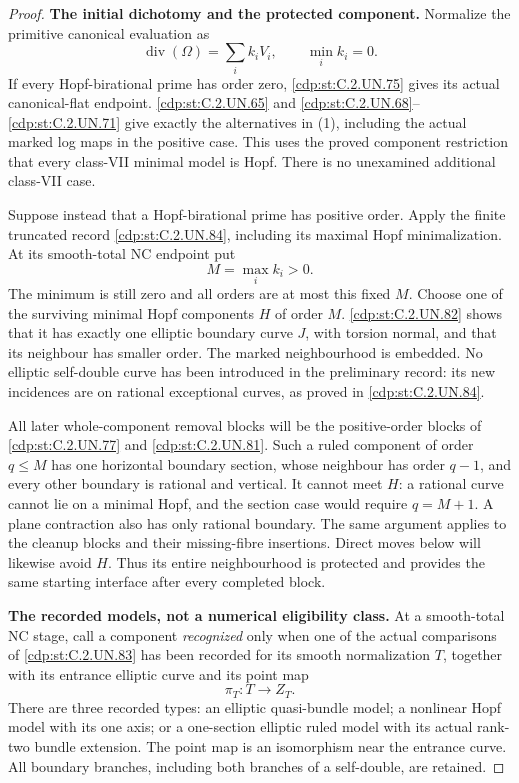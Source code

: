 \begin{proof}
\par\medskip\noindent\textbf{The initial dichotomy and the protected component.}
Normalize the primitive canonical evaluation as
\[
       \operatorname{div}(\Omega)=\sum_i k_iV_i,
       \qquad \min_i k_i=0.
 \tag{C.GP.2}\label{cdp:eq:C.GP.2}
\]
If every Hopf-birational prime has order zero, \ref{cdp:st:C.2.UN.75}
gives its actual canonical-flat endpoint. \ref{cdp:st:C.2.UN.65} and
\ref{cdp:st:C.2.UN.68}--\ref{cdp:st:C.2.UN.71} give exactly the alternatives in (1),
including the actual marked log maps in the positive
case. This uses the proved component restriction that
every class-VII minimal model is Hopf. There is no
unexamined additional class-VII case.

Suppose instead that a Hopf-birational prime has
positive order. Apply the finite truncated record
\ref{cdp:st:C.2.UN.84}, including its maximal Hopf minimalization. At
its smooth-total NC endpoint put
\[
                  M=\max_i k_i>0.
 \tag{C.GP.3}\label{cdp:eq:C.GP.3}
\]
The minimum is still zero and all orders are at
most this fixed \(M\). Choose one of the surviving
minimal Hopf components \(H\) of order \(M\).
\ref{cdp:st:C.2.UN.82} shows that it has exactly one elliptic
boundary curve \(J\), with torsion normal, and
that its neighbour has smaller order. The marked
neighbourhood is embedded. No elliptic self-double
curve has been introduced in the preliminary
record: its new incidences are on rational
exceptional curves, as proved in \ref{cdp:st:C.2.UN.84}.

All later whole-component removal blocks will be
the positive-order blocks of \ref{cdp:st:C.2.UN.77} and \ref{cdp:st:C.2.UN.81}. Such
a ruled component of order \(q\le M\) has one
horizontal boundary section, whose neighbour has
order \(q-1\), and every other boundary is rational
and vertical. It cannot meet \(H\): a rational
curve cannot lie on a minimal Hopf, and the
section case would require \(q=M+1\). A plane
contraction also has only rational boundary.
The same argument applies to the cleanup blocks
and their missing-fibre insertions. Direct moves
below will likewise avoid \(H\). Thus its entire
neighbourhood is protected and provides the same
starting interface after every completed block.

\par\medskip\noindent\textbf{The recorded models, not a numerical eligibility class.}
At a smooth-total NC stage, call a component
\emph{recognized} only when one of the actual
comparisons of \ref{cdp:st:C.2.UN.83} has been recorded for its
smooth normalization \(T\), together with its
entrance elliptic curve and its point map
\[
                         \pi_T:T\longrightarrow Z_T.
 \tag{C.GP.4}\label{cdp:eq:C.GP.4}
\]
There are three recorded types: an elliptic
quasi-bundle model; a nonlinear Hopf model with
its one axis; or a one-section elliptic ruled
model with its actual rank-two bundle extension.
The point map is an isomorphism near the entrance
curve. All boundary branches, including both
branches of a self-double, are retained.


\end{proof}
